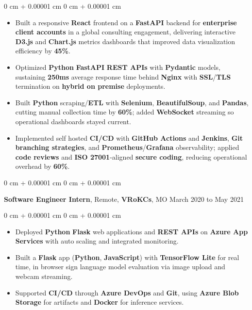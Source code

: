 \documentclass[10pt, letterpaper]{article}
\newenvironment{highlights}{
    \begin{itemize}[
        topsep=0.04 cm,
        parsep=0.04 cm,
        partopsep=0pt,
        itemsep=0pt,
        leftmargin=0 cm + 10pt
    ]
}{
    \end{itemize}
} %
\newenvironment{onecolentry}{
    \begin{adjustwidth}{
        0 cm + 0.00001 cm
    }{
        0 cm + 0.00001 cm
    }
}{
    \end{adjustwidth}
} %
\newcommand{\resumeheading}[2]{%
    \begin{onecolentry}
        #1 \hfill #2
    \end{onecolentry}
} %
\begin{document}
\begin{onecolentry}
\begin{highlights}
	\item Built a responsive \textbf{React} frontend on a \textbf{FastAPI} backend for \textbf{enterprise client accounts} in a global consulting engagement, delivering interactive \textbf{D3.js} and \textbf{Chart.js} metrics dashboards that improved data visualization efficiency by \textbf{45\%}.
	\item Optimized \textbf{Python} \textbf{FastAPI} \textbf{REST APIs} with \textbf{Pydantic} models, sustaining \textbf{250ms} average response time behind \textbf{Nginx} with \textbf{SSL}/\textbf{TLS} termination on \textbf{hybrid on premise} deployments.
	\item Built \textbf{Python} scraping/\textbf{ETL} with \textbf{Selenium}, \textbf{BeautifulSoup}, and \textbf{Pandas}, cutting manual collection time by \textbf{60\%}; added \textbf{WebSocket} streaming so operational dashboards stayed current.
	\item Implemented self hosted \textbf{CI/CD} with \textbf{GitHub Actions} and \textbf{Jenkins}, \textbf{Git} \textbf{branching strategies}, and \textbf{Prometheus}/\textbf{Grafana} observability; applied \textbf{code reviews} and \textbf{ISO 27001}-aligned \textbf{secure coding}, reducing operational overhead by \textbf{60\%}.
\end{highlights}
\end{onecolentry}






\vspace{0.15 cm}
\resumeheading{\textbf{Software Engineer Intern}, Remote, \textbf{VRoKCs}, MO}{March 2020 to May 2021}
\begin{onecolentry}
\begin{highlights}
	\item Deployed \textbf{Python} \textbf{Flask} web applications and \textbf{REST APIs} on \textbf{Azure App Services} with auto scaling and integrated monitoring.
	\item Built a \textbf{Flask} app (\textbf{Python}, \textbf{JavaScript}) with \textbf{TensorFlow Lite} for real time, in browser sign language model evaluation via image upload and webcam streaming.
	\item Supported \textbf{CI/CD} through \textbf{Azure DevOps} and \textbf{Git}, using \textbf{Azure Blob Storage} for artifacts and \textbf{Docker} for inference services.
\end{highlights}
\end{onecolentry}
\end{document}
